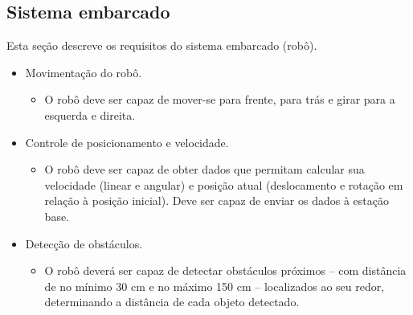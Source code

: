 \subsection{Sistema embarcado}
Esta seção descreve os requisitos do sistema embarcado (robô).

\begin{itemize} %

  \item Movimentação do robô.
    \begin{itemize}
      \item O robô deve ser capaz de mover-se para frente, para trás e girar para a esquerda e direita.
    \end{itemize}

  \item Controle de posicionamento e velocidade.
    \begin{itemize}
      \item O robô deve ser capaz de obter dados que permitam calcular sua velocidade (linear e angular) e posição atual (deslocamento e rotação em relação à posição inicial). Deve ser capaz de enviar os dados à estação base.
    \end{itemize}

  \item Detecção de obstáculos.
    \begin{itemize}
      \item O robô deverá ser capaz de detectar obstáculos próximos -- com distância de no mínimo 30 cm e no máximo 150 cm -- localizados ao seu redor, determinando a distância de cada objeto detectado.
    \end{itemize}

\end{itemize} %

